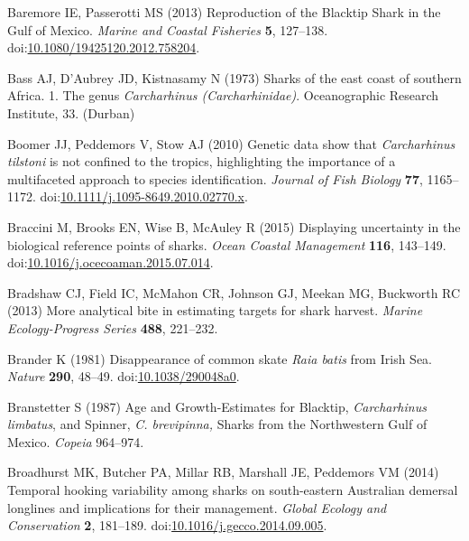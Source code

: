 \documentclass[]{article}
\begin{document}
\hypertarget{ref-baremore_reproduction_2013}{}
Baremore IE, Passerotti MS (2013) Reproduction of the Blacktip Shark in
the Gulf of Mexico. \emph{Marine and Coastal Fisheries} \textbf{5},
127--138.
doi:\href{https://doi.org/10.1080/19425120.2012.758204}{10.1080/19425120.2012.758204}.

\hypertarget{ref-bass_sharks_1973}{}
Bass AJ, D'Aubrey JD, Kistnasamy N (1973) Sharks of the east coast of
southern Africa. 1. The genus \emph{Carcharhinus (Carcharhinidae)}.
Oceanographic Research Institute, 33. (Durban)

\hypertarget{ref-boomer_genetic_2010}{}
Boomer JJ, Peddemors V, Stow AJ (2010) Genetic data show that
\emph{Carcharhinus tilstoni} is not confined to the tropics,
highlighting the importance of a multifaceted approach to species
identification. \emph{Journal of Fish Biology} \textbf{77}, 1165--1172.
doi:\href{https://doi.org/10.1111/j.1095-8649.2010.02770.x}{10.1111/j.1095-8649.2010.02770.x}.

\hypertarget{ref-braccini_displaying_2015}{}
Braccini M, Brooks EN, Wise B, McAuley R (2015) Displaying uncertainty
in the biological reference points of sharks. \emph{Ocean Coastal
Management} \textbf{116}, 143--149.
doi:\href{https://doi.org/10.1016/j.ocecoaman.2015.07.014}{10.1016/j.ocecoaman.2015.07.014}.

\hypertarget{ref-bradshaw_more_2013}{}
Bradshaw CJ, Field IC, McMahon CR, Johnson GJ, Meekan MG, Buckworth RC
(2013) More analytical bite in estimating targets for shark harvest.
\emph{Marine Ecology-Progress Series} \textbf{488}, 221--232.

\hypertarget{ref-brander_disappearance_1981}{}
Brander K (1981) Disappearance of common skate \emph{Raia batis} from
Irish Sea. \emph{Nature} \textbf{290}, 48--49.
doi:\href{https://doi.org/10.1038/290048a0}{10.1038/290048a0}.

\hypertarget{ref-branstetter_age_1987}{}
Branstetter S (1987) Age and Growth-Estimates for Blacktip,
\emph{Carcharhinus limbatus}, and Spinner, \emph{C. brevipinna,} Sharks
from the Northwestern Gulf of Mexico. \emph{Copeia} 964--974.

\hypertarget{ref-broadhurst_temporal_2014}{}
Broadhurst MK, Butcher PA, Millar RB, Marshall JE, Peddemors VM (2014)
Temporal hooking variability among sharks on south-eastern Australian
demersal longlines and implications for their management. \emph{Global
Ecology and Conservation} \textbf{2}, 181--189.
doi:\href{https://doi.org/10.1016/j.gecco.2014.09.005}{10.1016/j.gecco.2014.09.005}.
\end{document}
